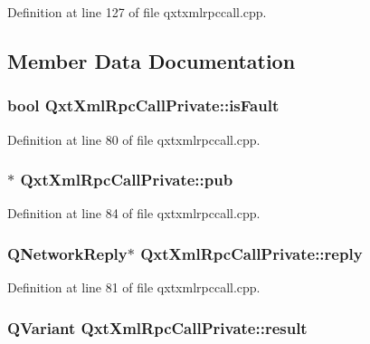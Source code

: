 Definition at line 127 of file qxtxmlrpccall.\-cpp.



\subsection{Member Data Documentation}
\hypertarget{class_qxt_xml_rpc_call_private_a83cf37bc4fe233ad7c50476255c409f0}{
\subsubsection[{is\-Fault}]{\setlength{\rightskip}{0pt plus 5cm}bool Qxt\-Xml\-Rpc\-Call\-Private\-::is\-Fault}}\label{class_qxt_xml_rpc_call_private_a83cf37bc4fe233ad7c50476255c409f0}


Definition at line 80 of file qxtxmlrpccall.\-cpp.

\hypertarget{class_qxt_xml_rpc_call_private_aa36970f27eac9c77e51a2713627f717e}{
\subsubsection[{pub}]{$\ast$ Qxt\-Xml\-Rpc\-Call\-Private\-::pub}}\label{class_qxt_xml_rpc_call_private_aa36970f27eac9c77e51a2713627f717e}


Definition at line 84 of file qxtxmlrpccall.\-cpp.

\hypertarget{class_qxt_xml_rpc_call_private_acd37ffbe47b2c3fcae4441c9a4674716}{
\subsubsection[{reply}]{\setlength{\rightskip}{0pt plus 5cm}Q\-Network\-Reply$\ast$ Qxt\-Xml\-Rpc\-Call\-Private\-::reply}}\label{class_qxt_xml_rpc_call_private_acd37ffbe47b2c3fcae4441c9a4674716}


Definition at line 81 of file qxtxmlrpccall.\-cpp.

\hypertarget{class_qxt_xml_rpc_call_private_a03bd0aae66fc69b2978f84a0e6c8b310}{
\subsubsection[{result}]{\setlength{\rightskip}{0pt plus 5cm}Q\-Variant Qxt\-Xml\-Rpc\-Call\-Private\-::result}}\label{class_qxt_xml_rpc_call_private_a03bd0aae66fc69b2978f84a0e6c8b310}


